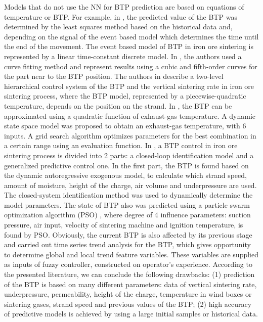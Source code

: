\documentclass[AMS,STIX2COL]{WileyNJD-v2}
\begin{document}
Models that do not use the NN for BTP prediction are based on equations of temperature or BTP. For example, in \cite{Kwon1999}, the predicted value of the BTP was determined by the least squares method based on the historical data and, depending on the signal of the event based model which determines the time until the end of the  movement. The event based model of BTP in iron ore sintering is represented by a linear time-constant discrete model. 
In \cite{Kim2014}, the authors used a curve fitting method and represent results using a cubic and fifth-order curves for the part near to the BTP position.
The authors in \cite{Wang2013} describe a two-level hierarchical control system of the BTP and the vertical sintering rate in iron ore sintering process, where the BTP model, represented by a piecewise-quadratic temperature, depends on the position on the strand.
In \cite{Cao2018}, the BTP can be approximated using a quadratic function of exhaust-gas temperature. A dynamic state space model was proposed to obtain an exhaust-gas temperature, with 6 inputs. A grid search algorithm optimizes parameters for the best combination in a certain range using an evaluation function.
In \cite{Wu2012a}, a BTP control in iron ore sintering process is divided into 2 parts: a closed-loop identification model and a generalized predictive control one. In the first part, the BTP is found based on the dynamic autoregressive exogenous model, to calculate which strand speed, amount of moisture, height of the charge, air volume and underpressure are used. The closed-system identification method was used to dynamically determine the model parameters. 
The state of BTP also was predicted using a particle swarm optimization algorithm (PSO) \cite{Shi2016}, where degree of 4 influence parameters: suction pressure, air input, velocity of sintering machine and ignition temperature, is found by PSO. 
Obviously, the current BTP is also affected by its previous stage and \cite{Du20191} carried out time series trend analysis for the BTP, which gives opportunity to determine global and local trend feature variables. These variables are supplied as inputs of fuzzy controller, constructed on operator's experience.
According to the presented literature, we can conclude the following drawbacks: (1) prediction of the BTP is based on many different parameters: data of vertical sintering rate, underpressure, permeability, height of the charge, temperature in wind boxes or sintering gases, strand speed and previous values of the BTP; (2) high accuracy of predictive models is achieved by using a large initial samples or historical data.
\end{document}
